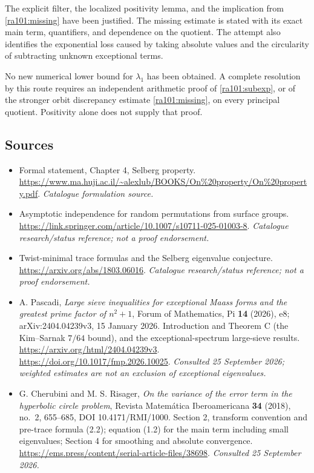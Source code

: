 \documentclass[11pt]{article}
\begin{document}
The explicit filter, the localized positivity lemma, and the implication
from \eqref{ra101:missing} have been justified. The missing estimate is stated
with its exact main term, quantifiers, and dependence on the quotient. The
attempt also identifies the exponential loss caused by taking absolute values
and the circularity of subtracting unknown exceptional terms.

No new numerical lower bound for $\lambda_1$ has been obtained. A complete
resolution by this route requires an independent arithmetic proof of
\eqref{ra101:subexp}, or of the stronger orbit discrepancy estimate
\eqref{ra101:missing}, on every principal quotient. Positivity alone does not
supply that proof.

\subsection{Sources}
\begin{itemize}\raggedright
\item[\textnormal{[S1]}]\hypertarget{source:101:1}{} Formal statement, Chapter 4, Selberg property.
\url{https://www.ma.huji.ac.il/~alexlub/BOOKS/On%20property/On%20property.pdf}.
{\small\textit{Catalogue formulation source.}}
\item[\textnormal{[S2]}]\hypertarget{source:101:2}{} Asymptotic independence for random permutations from surface groups.
\url{https://link.springer.com/article/10.1007/s10711-025-01003-8}.
{\small\textit{Catalogue research/status reference; not a proof endorsement.}}
\item[\textnormal{[S3]}]\hypertarget{source:101:3}{} Twist-minimal trace formulas and the Selberg eigenvalue conjecture.
\url{https://arxiv.org/abs/1803.06016}.
{\small\textit{Catalogue research/status reference; not a proof endorsement.}}
\item[\textnormal{[E1]}]\hypertarget{extra:101:1}{}
A. Pascadi, \emph{Large sieve inequalities for exceptional Maass forms and
the greatest prime factor of $n^2+1$}, Forum of Mathematics, Pi \textbf{14}
(2026), e8; arXiv:2404.04239v3, 15 January 2026. Introduction and Theorem C
(the Kim--Sarnak $7/64$ bound), and the exceptional-spectrum large-sieve
results. \url{https://arxiv.org/html/2404.04239v3}.
\url{https://doi.org/10.1017/fmp.2026.10025}.
{\small\textit{Consulted 25 September 2026; weighted estimates are not an
exclusion of exceptional eigenvalues.}}
\item[\textnormal{[E2]}]\hypertarget{extra:101:2}{}
G. Cherubini and M. S. Risager, \emph{On the variance of the error term in
the hyperbolic circle problem}, Revista Matem\'atica Iberoamericana
\textbf{34} (2018), no.~2, 655--685, DOI 10.4171/RMI/1000.
Section 2, transform convention and pre-trace formula (2.2); equation (1.2)
for the main term including small eigenvalues; Section 4 for smoothing and
absolute convergence.
\url{https://ems.press/content/serial-article-files/38698}.
{\small\textit{Consulted 25 September 2026.}}
\end{itemize}
\end{document}
